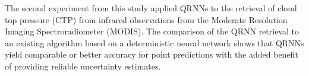 %
%

The second experiment from this study applied QRNNs to the retrieval of cloud
top pressure (CTP) from infrared observations from the Moderate Resolution
Imaging Spectroradiometer (MODIS). The comparison of the QRNN retrieval to an
existing algorithm based on a deterministic neural network shows that QRNNs
yield comparable or better accuracy for point predictions with the added benefit
of providing reliable uncertainty estimates.

